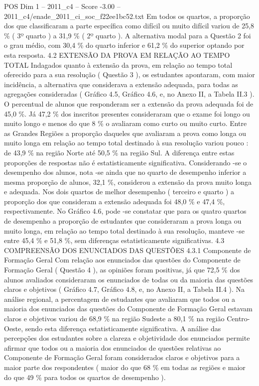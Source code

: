 \begin{textsample}{POS Dim 1 – 2011\_c4 – Score -3.00 – 2011\_c4/enade\_2011\_ci\_soc\_f22ee1bc52.txt}
Em todos os quartos, a proporção dos que classificaram a parte específica como difícil ou muito difícil variou de 25,8 \% ( 3º quarto ) a 31,9 \% ( 2º quarto ).
A alternativa modal para a Questão 2 foi o grau médio, com 30,4 \% do quarto inferior e 61,2 \% do superior optando por esta resposta. 4.2 EXTENSÃO DA PROVA EM RELAÇÃO AO TEMPO TOTAL Indagados quanto à extensão da prova, em relação ao tempo total oferecido para a sua resolução ( Questão 3 ), os estudantes apontaram, com maior incidência, a alternativa que considerava a extensão adequada, para todas as agregações consideradas ( Gráfico 4.5, Gráfico 4.6, e, no Anexo II, a Tabela II.3 ).
O percentual de alunos que responderam ser a extensão da prova adequada foi de 45,0 \%.
Já 47,2 \% dos inscritos presentes consideraram que o exame foi longo ou muito longo e menos do que 8 \% o avaliaram como curto ou muito curto.
Entre as Grandes Regiões a proporção daqueles que avaliaram a prova como longa ou muito longa em relação ao tempo total destinado à sua resolução variou pouco : de 43,9 \% na região Norte até 50,5 \% na região Sul.
A diferença entre estas proporções de respostas não é estatisticamente significativa.
Considerando -se o desempenho dos alunos, nota -se ainda que no quarto de desempenho inferior a mesma proporção de alunos, 32,1 \%, considerou a extensão da prova muito longa e adequada.
Nos dois quartos de melhor desempenho ( terceiro e quarto ) a proporção dos que consideram a extensão adequada foi 48,0 \% e 47,4 \%, respectivamente.
No Gráfico 4.6, pode -se constatar que para os quatro quartos de desempenho a proporção de estudantes que consideraram a prova longa ou muito longa, em relação ao tempo total destinado à sua resolução, manteve -se entre 45,4 \% e 51,8 \%, sem diferenças estatisticamente significativas. 4.3 COMPREENSÃO DOS ENUNCIADOS DAS QUESTÕES 4.3.1 Componente de Formação Geral Com relação aos enunciados das questões do Componente de Formação Geral ( Questão 4 ), as opiniões foram positivas, já que 72,5 \% dos alunos avaliados consideraram os enunciados de todas ou da maioria das questões claros e objetivos ( Gráfico 4.7, Gráfico 4.8, e, no Anexo II, a Tabela II.4 ).
Na análise regional, a percentagem de estudantes que avaliaram que todos ou a maioria dos enunciados das questões do Componente de Formação Geral estavam claros e objetivos variou de 68,9 \% na região Sudeste a 80,1 \% na região Centro-Oeste, sendo esta diferença estatisticamente significativa.
A análise das percepções dos estudantes sobre a clareza e objetividade dos enunciados permite afirmar que todos ou a maioria dos enunciados de questões relativas ao Componente de Formação Geral foram considerados claros e objetivos para a maior parte dos respondentes ( maior do que 68 \% em todas as regiões e maior do que 49 \% para todos os quartos de desempenho ).

\end{textsample}
